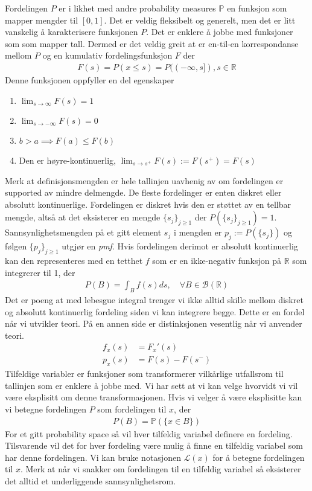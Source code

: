Fordelingen $P$ er i likhet med andre probability measures $\mathbb{P}$ en funksjon som mapper mengder til $[0,1]$. Det er veldig fleksibelt og generelt, men det er litt vanskelig å karakterisere funksjonen $P$. Det er enklere å jobbe med funksjoner som som mapper tall. Dermed er det veldig greit at er en-til-en korrespondanse mellom $P$ og en kumulativ fordelingsfunksjon $F$ der
\begin{align}
F(s) = P(x\leq s) = P((-\infty, s]), s \in \mathbb{R}
\end{align}
Denne funksjonen oppfyller en del egenskaper
\begin{enumerate}
\item $\lim_{s\to\infty} F(s) = 1$
\item $\lim_{s\to-\infty} F(s) = 0$
\item $b>a \implies F(a) \leq F(b)$
\item Den er høyre-kontinuerlig, $\lim_{s\to s^+}F(s):=F(s^+)=F(s)$
\end{enumerate}
Merk at definisjonsmengden er hele tallinjen uavhenig av om fordelingen er supported av mindre delmengde. De fleste fordelinger er enten diskret eller absolutt kontinuerlige. Fordelingen er diskret hvis den er støttet av en tellbar mengde, altså at det eksisterer en mengde $\{s_j\}_{j\geqslant1} $ der $P(\{s_j\}_{j\geqslant1})=1$. Sannsynlighetsmengden på et gitt element $s_j$ i mengden er $p_j :=P(\{s_j\})$ og følgen $\{p_j\}_{j \geqslant 1}$ utgjør en \textit{pmf}. Hvis fordelingen derimot er absolutt kontinuerlig kan den representeres med en tetthet $f$ som er en ikke-negativ funksjon på $\mathbb{R}$ som integrerer til 1, der
\begin{align}
P(B) = \int_B f(s)ds,\quad \forall B \in \mathscr{B}(\mathbb{R})
\end{align}
Det er poeng at med lebesgue integral trenger vi ikke alltid skille mellom diskret og absolutt kontinuerlig fordeling siden vi kan integrere begge. Dette er en fordel når vi utvikler teori. På en annen side er distinksjonen vesentlig når vi anvender teori. 
\begin{align}
f_x(s) &= F_x'(s) \\
p_x(s) &= F(s)-F(s^-)
\end{align}
Tilfeldige variabler er funksjoner som transformerer vilkårlige utfallsrom til tallinjen som er enklere å jobbe med. Vi har sett at vi kan velge hvorvidt vi vil være eksplisitt om denne transformasjonen. Hvis vi velger å være eksplisitte kan vi betegne fordelingen $P$ som fordelingen til $x$, der
\begin{align}
P(B) = \mathbb{P}(\{x\in B\}) 
\end{align}
For et gitt probability space så vil hver tilfeldig variabel definere en fordeling. Tilsvarende vil det for hver fordeling være mulig å finne en tilfeldig variabel som har denne fordelingen. Vi kan bruke notasjonen $\mathcal{L}(x)$ for å betegne fordelingen til $x$. Merk at når vi snakker om fordelingen til en tilfeldig variabel så eksisterer det alltid et underliggende sannsynlighetsrom.  
